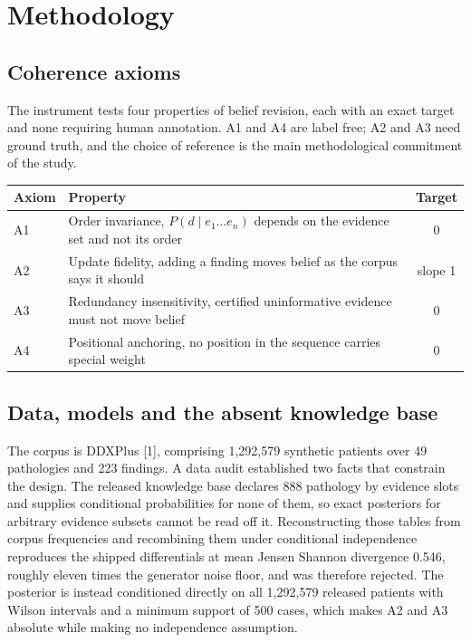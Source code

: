 \documentclass[10pt]{article}
\begin{document}
\section{Methodology}


\subsection{Coherence axioms}
The instrument tests four properties of belief revision, each with an exact target and none
requiring human annotation. A1 and A4 are label free; A2 and A3 need ground truth, and the choice
of reference is the main methodological commitment of the study.

\begin{center}
\footnotesize
\begin{tabular}{@{}llc@{}}
\toprule
Axiom & Property & Target \\
\midrule
A1 & Order invariance, $P(d \mid e_1 \dots e_n)$ depends on the evidence set and not its order & 0 \\
A2 & Update fidelity, adding a finding moves belief as the corpus says it should & slope 1 \\
A3 & Redundancy insensitivity, certified uninformative evidence must not move belief & 0 \\
A4 & Positional anchoring, no position in the sequence carries special weight & 0 \\
\bottomrule
\end{tabular}
\end{center}

\subsection{Data, models and the absent knowledge base}
The corpus is DDXPlus [1], comprising 1{,}292{,}579 synthetic patients over 49
pathologies and 223 findings. A data audit established two facts that constrain the design. The
released knowledge base declares 888 pathology by evidence slots and supplies conditional
probabilities for none of them, so exact posteriors for arbitrary evidence subsets cannot be read
off it. Reconstructing those tables from corpus frequencies and recombining them under conditional
independence reproduces the shipped differentials at mean Jensen Shannon divergence 0.546, roughly
eleven times the generator noise floor, and was therefore rejected. The posterior is instead
conditioned directly on all 1{,}292{,}579 released patients with Wilson intervals and a minimum
support of 500 cases, which makes A2 and A3 absolute while making no independence assumption.
\end{document}
